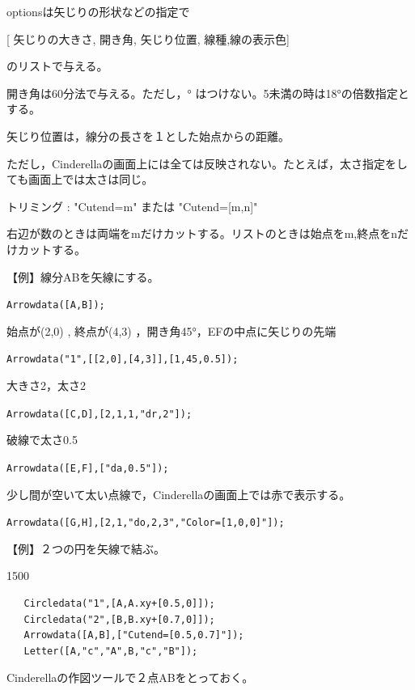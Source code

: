 \documentclass[papersize,a4paper,12pt,uplatex]{jsarticle}
\begin{document}
\begin{description}
optionsは矢じりの形状などの指定で
  
\hspace{10mm} [ 矢じりの大きさ, 開き角, 矢じり位置, 線種,線の表示色] 

のリストで与える。
  
開き角は60分法で与える。ただし，° はつけない。5未満の時は18°の倍数指定とする。
  
  矢じり位置は，線分の長さを１とした始点からの距離。
  
ただし，Cinderellaの画面上には全ては反映されない。たとえば，太さ指定をしても画面上では太さは同じ。
 
 トリミング :  "Cutend=m" または "Cutend=[m,n]" 

右辺が数のときは両端をmだけカットする。リストのときは始点をm,終点をnだけカットする。

\vspace{\baselineskip}
【例】線分ABを矢線にする。
  
\hspace{10mm} \verb|Arrowdata([A,B]);|

始点が(2,0) , 終点が(4,3) ，開き角45°，EFの中点に矢じりの先端
      
\hspace{10mm}  \verb|Arrowdata("1",[[2,0],[4,3]],[1,45,0.5]);|
        
大きさ2，太さ2
      
\hspace{10mm} \verb|Arrowdata([C,D],[2,1,1,"dr,2"]);|
        
破線で太さ0.5
      
\hspace{10mm} \verb|Arrowdata([E,F],["da,0.5"]);|
        
 少し間が空いて太い点線で，Cinderellaの画面上では赤で表示する。
      
\hspace{10mm} \verb|Arrowdata([G,H],[2,1,"do,2,3","Color=[1,0,0]"]);| 

\hspace{20mm}  

【例】２つの円を矢線で結ぶ。
  
\begin{layer}{150}{0}
\end{layer}
\hspace{20mm}

\begin{verbatim}
   Circledata("1",[A,A.xy+[0.5,0]]);
   Circledata("2",[B,B.xy+[0.7,0]]);
   Arrowdata([A,B],["Cutend=[0.5,0.7]"]);
   Letter([A,"c","A",B,"c","B"]);
\end{verbatim}
  Cinderellaの作図ツールで２点ABをとっておく。


\end{description}
\end{document}
